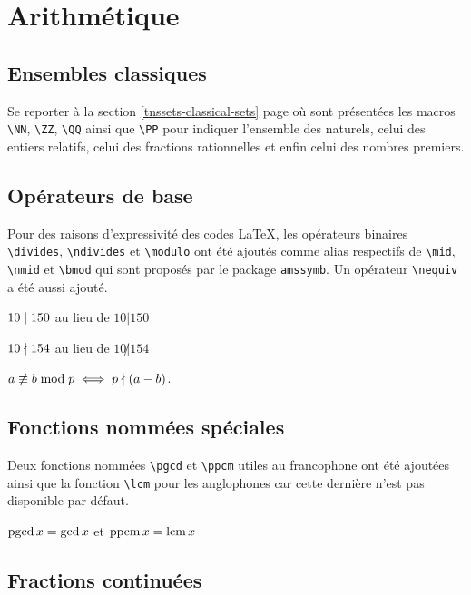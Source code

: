 \documentclass[12pt,a4paper]{book}
\makeatletter
\newcommand\env[1]{\texttt{#1}}
\newcommand\macro[1]{\env{\textbackslash{}#1}}
\theoremstyle{definition}
\newcounter{paraexample}[subsubsection]
\newcommand\@newexample@abstract[2]{%
	\paragraph{%
		#1%
		\if\relax\detokenize{#2}\relax\else {} -- #2\fi%
	}%
}
\newcommand\newparaexample{\@ifstar{\@newparaexample@star}{\@newparaexample@no@star}}
\newcommand\@newparaexample@no@star[1]{%
	\refstepcounter{paraexample}%
	\@newexample@abstract{Exemple \theparaexample}{#1}%
}
\newcommand\@newparaexample@star[1]{%
	\@newexample@abstract{Exemple}{#1}%
}
\makeatother
\begin{document}
{{\chapter{Arithmétique}

\section{Ensembles classiques}

Se reporter à la section \ref{tnssets-classical-sets} page \pageref{tnssets-classical-sets} où sont présentées les macros \macro{NN}, \macro{ZZ}, \macro{QQ} ainsi que \macro{PP} pour indiquer l'ensemble des naturels, celui des entiers relatifs, celui des fractions rationnelles et enfin celui des nombres premiers.
\section{Opérateurs de base}

Pour des raisons d'expressivité des codes \LaTeX{}, les opérateurs binaires \macro{divides}, \macro{ndivides} et \macro{modulo} ont été ajoutés comme alias respectifs de \macro{mid}, \macro{nmid} et \macro{bmod} qui sont proposés par le package \verb+amssymb+. Un opérateur \macro{nequiv} a été aussi ajouté.

\begin{latexex}
$10 \mid 150$ au lieu de
$10 | 150$

$10 \nmid 154$ au lieu de
$10 \not| 154$

$a \nequiv b \modulo p
 \iff
 p \ndivides (a - b)$.
\end{latexex}


\section{Fonctions nommées spéciales}


Deux fonctions nommées \macro{pgcd} et \macro{ppcm} utiles au francophone ont été ajoutées ainsi que la fonction \macro{lcm} pour les anglophones car cette dernière n'est pas disponible par défaut.

\begin{latexex}
$\operatorname{\operatorname{pgcd}} x = \gcd x$ et $\operatorname{\operatorname{ppcm}} x = \operatorname{\operatorname{lcm}} x$
\end{latexex}


\section{Fractions continuées}

}}
\end{document}
